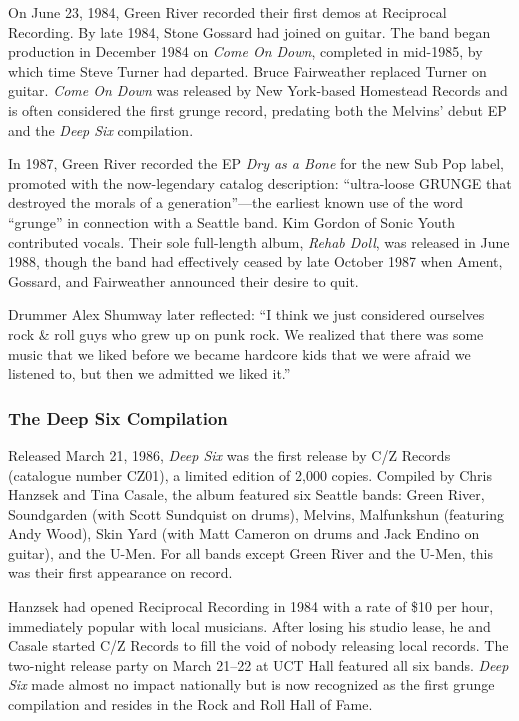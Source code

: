 \documentclass[11pt,letterpaper]{article}
\begin{document}
On June 23, 1984, Green River recorded their first demos at Reciprocal Recording. By late 1984, Stone Gossard had joined on guitar. The band began production in December 1984 on \textit{Come On Down}, completed in mid-1985, by which time Steve Turner had departed. Bruce Fairweather replaced Turner on guitar. \textit{Come On Down} was released by New York-based Homestead Records and is often considered the first grunge record, predating both the Melvins' debut EP and the \textit{Deep Six} compilation.

In 1987, Green River recorded the EP \textit{Dry as a Bone} for the new Sub Pop label, promoted with the now-legendary catalog description: ``ultra-loose GRUNGE that destroyed the morals of a generation''---the earliest known use of the word ``grunge'' in connection with a Seattle band. Kim Gordon of Sonic Youth contributed vocals. Their sole full-length album, \textit{Rehab Doll}, was released in June 1988, though the band had effectively ceased by late October 1987 when Ament, Gossard, and Fairweather announced their desire to quit.

Drummer Alex Shumway later reflected: ``I think we just considered ourselves rock \& roll guys who grew up on punk rock. We realized that there was some music that we liked before we became hardcore kids that we were afraid we listened to, but then we admitted we liked it.''

\subsubsection{The Deep Six Compilation}

Released March 21, 1986, \textit{Deep Six} was the first release by C/Z Records (catalogue number CZ01), a limited edition of 2,000 copies. Compiled by Chris Hanzsek and Tina Casale, the album featured six Seattle bands: Green River, Soundgarden (with Scott Sundquist on drums), Melvins, Malfunkshun (featuring Andy Wood), Skin Yard (with Matt Cameron on drums and Jack Endino on guitar), and the U-Men. For all bands except Green River and the U-Men, this was their first appearance on record.

Hanzsek had opened Reciprocal Recording in 1984 with a rate of \$10 per hour, immediately popular with local musicians. After losing his studio lease, he and Casale started C/Z Records to fill the void of nobody releasing local records. The two-night release party on March 21--22 at UCT Hall featured all six bands. \textit{Deep Six} made almost no impact nationally but is now recognized as the first grunge compilation and resides in the Rock and Roll Hall of Fame.
\end{document}
